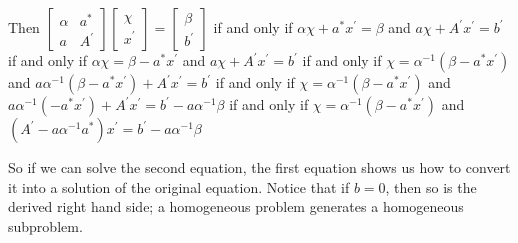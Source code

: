 \documentclass{article}
\begin{document}
Then 
\begin{math}{}
\begin{bmatrix}\alpha & a^* \\ a & A^{'}\end{bmatrix}\begin{bmatrix}\chi\\x^{'}\end{bmatrix}=\begin{bmatrix}\beta\\b^{'}\end{bmatrix}
\end{math}
if and only if
\begin{math}{}\alpha\chi + a^*x^{'} = \beta\end{math} and
\begin{math}{}a\chi + A^{'}x^{'} = b^{'}\end{math}
if and only if
\begin{math}{}\alpha\chi= \beta - a^*x^{'} \end{math} and
\begin{math}{}a\chi + A^{'}x^{'} = b^{'}\end{math}
if and only if
\begin{math}{}\chi= \alpha^{-1}(\beta - a^*x^{'})\end{math} and
\begin{math}{}a\alpha^{-1}(\beta - a^*x^{'}) + A^{'}x^{'} = b^{'}\end{math}
if and only if
\begin{math}{}\chi= \alpha^{-1}(\beta - a^*x^{'})\end{math} and
\begin{math}{}a\alpha^{-1}(- a^*x^{'}) + A^{'}x^{'} = b^{'}-a\alpha^{-1}\beta\end{math}
if and only if
\begin{math}{}\chi= \alpha^{-1}(\beta - a^*x^{'})\end{math} and
\begin{math}{}(A^{'} - a\alpha^{-1}a^*)x^{'} = b^{'}-a\alpha^{-1}\beta\end{math}

So if we can solve the second equation, the first equation shows us how to convert it into a solution
of the original equation. Notice that if 
\begin{math}{}b =0\end{math}, then so is the derived right hand side; a homogeneous problem generates
a homogeneous subproblem.
\end{document}
